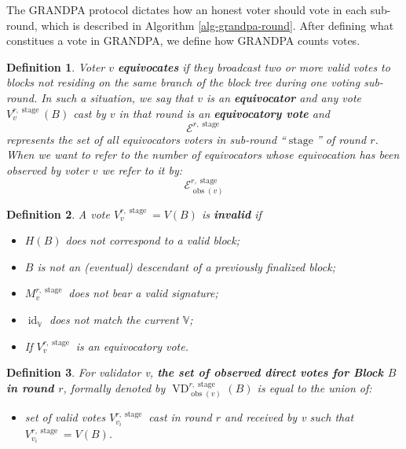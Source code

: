 \documentclass{article}
\newcommand{\nosymbol}{}
\newcommand{\tmop}[1]{\ensuremath{\operatorname{#1}}}
\newcommand{\tmstrong}[1]{\textbf{#1}}
\newcommand{\tmtextbf}[1]{{\bfseries{#1}}}
\newcommand{\tmtexttt}[1]{{\ttfamily{#1}}}
\newcommand{\tmverbatim}[1]{{\ttfamily{#1}}}
\newenvironment{itemizedot}{\begin{itemize} \renewcommand{\labelitemi}{$\bullet$}\renewcommand{\labelitemii}{$\bullet$}\renewcommand{\labelitemiii}{$\bullet$}\renewcommand{\labelitemiv}{$\bullet$}}{\end{itemize}}
\newtheorem{definition}{Definition}
\providecommand{\nosymbol}{}
\providecommand{\tmop}[1]{\ensuremath{\mathrm{#1}}}
\providecommand{\tmstrong}[1]{\tmtextbf{#1}}
\providecommand{\tmtextbf}[1]{\tmtextbf{#1}}
\providecommand{\tmverbatim}[1]{\tmtexttt{#1}}
\newtheorem{definition}{Definition}
\begin{document}
The GRANDPA protocol dictates how an honest voter should vote in each
sub-round, which is described in Algorithm \ref{alg-grandpa-round}. After
defining what constitues a vote in GRANDPA, we define how GRANDPA counts
votes.

\begin{definition}
  Voter $v$ {\tmstrong{equivocates}} if they broadcast two or more valid votes
  to blocks not residing on the same branch of the block tree during one
  voting sub-round. In such a situation, we say that $v$ is an
  {\tmstrong{equivocator}} and any vote $V_v^{r, \tmop{stage}} (B)$ cast by
  $v$ in that round is an {\tmstrong{equivocatory vote}} and
  \[ \mathcal{E}^{r, \tmop{stage}} \]
  represents the set of all equivocators voters in sub-round
  ``$\tmop{stage}$'' of round $r$. When we want to refer to the number
  of\tmverbatim{} equivocators whose equivocation has been observed by voter
  $v$ we refer to it by:
  \[ \mathcal{E}^{r, \tmop{stage}}_{\tmop{obs} (v)} \]
  
\end{definition}

\begin{definition}
  A vote $V_v^{r, \tmop{stage}} = V (B)$ is {\tmstrong{invalid}} if
  \begin{itemize}
    \begin{itemizedot}
      \item $H (B)$ does not correspond to a valid block;
      
      \item $B$ is not an (eventual) descendant of a previously finalized
      block;
      
      \item $M^{r, \tmop{stage}}_v$ does not bear a valid signature;
      
      \item $\tmop{id}_{\mathbb{V}}$ does not match the current $\mathbb{V}$;
      
      \item If $V_v^{r, \tmop{stage}}$ is an equivocatory vote.
    \end{itemizedot}
  \end{itemize}
\end{definition}

\begin{definition}
  For validator v, {\tmstrong{the set of observed direct votes for Block $B$
  in round $r$}}, formally denoted by $\tmop{VD}^{r, \tmop{stage}}_{\tmop{obs}
  (v)}^{\nosymbol}_{\nosymbol} (B)$ is equal to the union of:
  \begin{itemizedot}
    \item set of valid votes $V^{r, \tmop{stage}}_{v_i}$ cast in round $r$ and
    received by v such that $V^{r, \tmop{stage}}_{v_i} = V (B)$.
  \end{itemizedot}
\end{definition}
\end{document}
